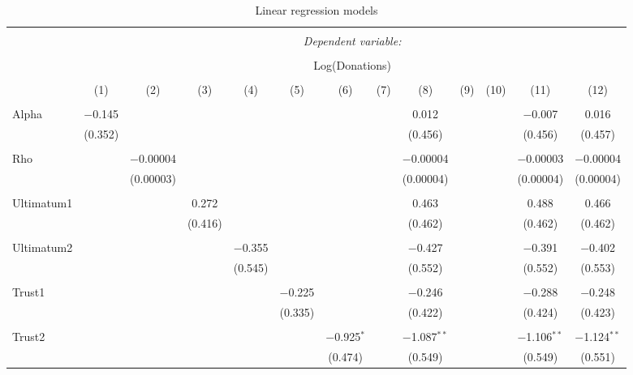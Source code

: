 \begin{table}[H] \centering 
  \caption{Linear regression models} 
  \label{} 
   \begin{adjustbox}{width=\textwidth}
   \begin{tabular}{@{\extracolsep{5pt}}lcccccccccccc} 
\\[-1.8ex]\hline 
\hline \\[-1.8ex] 
 & \multicolumn{12}{c}{\textit{Dependent variable:}} \\ 
\cline{2-13} 
\\[-1.8ex] & \multicolumn{12}{c}{Log(Donations)} \\ 
\\[-1.8ex] & (1) & (2) & (3) & (4) & (5) & (6) & (7) & (8) & (9) & (10) & (11) & (12)\\ 
\hline \\[-1.8ex] 
 Alpha & $-$0.145 &  &  &  &  &  &  & 0.012 &  &  & $-$0.007 & 0.016 \\ 
  & (0.352) &  &  &  &  &  &  & (0.456) &  &  & (0.456) & (0.457) \\ 
  & & & & & & & & & & & & \\ 
 Rho &  & $-$0.00004 &  &  &  &  &  & $-$0.00004 &  &  & $-$0.00003 & $-$0.00004 \\ 
  &  & (0.00003) &  &  &  &  &  & (0.00004) &  &  & (0.00004) & (0.00004) \\ 
  & & & & & & & & & & & & \\ 
 Ultimatum1 &  &  & 0.272 &  &  &  &  & 0.463 &  &  & 0.488 & 0.466 \\ 
  &  &  & (0.416) &  &  &  &  & (0.462) &  &  & (0.462) & (0.462) \\ 
  & & & & & & & & & & & & \\ 
 Ultimatum2 &  &  &  & $-$0.355 &  &  &  & $-$0.427 &  &  & $-$0.391 & $-$0.402 \\ 
  &  &  &  & (0.545) &  &  &  & (0.552) &  &  & (0.552) & (0.553) \\ 
  & & & & & & & & & & & & \\ 
 Trust1 &  &  &  &  & $-$0.225 &  &  & $-$0.246 &  &  & $-$0.288 & $-$0.248 \\ 
  &  &  &  &  & (0.335) &  &  & (0.422) &  &  & (0.424) & (0.423) \\ 
  & & & & & & & & & & & & \\ 
 Trust2 &  &  &  &  &  & $-$0.925$^{*}$ &  & $-$1.087$^{**}$ &  &  & $-$1.106$^{**}$ & $-$1.124$^{**}$ \\ 
  &  &  &  &  &  & (0.474) &  & (0.549) &  &  & (0.549) & (0.551) \\ 

\end{tabular}
\end{adjustbox}
\end{table}
